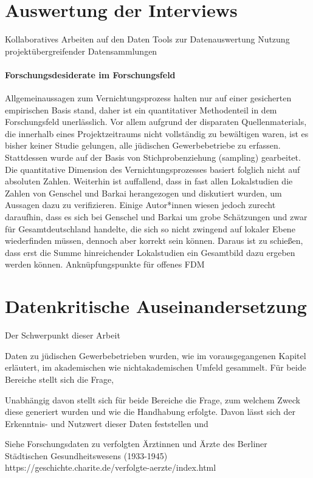 \section{Auswertung der Interviews}
{Kollaboratives Arbeiten auf den Daten
Tools zur Datenauswertung
Nutzung projektübergreifender Datensammlungen
\paragraph{Forschungsdesiderate im Forschungsfeld}Allgemeinaussagen zum Vernichtungsprozess halten nur auf einer gesicherten empirischen Basis stand, daher ist ein quantitativer Methodenteil in dem Forschungsfeld unerlässlich. Vor allem aufgrund der disparaten Quellenmaterials, die innerhalb eines Projektzeitraums nicht vollständig zu bewältigen waren, ist es bisher keiner Studie gelungen, alle jüdischen Gewerbebetriebe zu erfassen. Stattdessen wurde auf der Basis von Stichprobenziehung (sampling) gearbeitet. Die quantitative Dimension des Vernichtungsprozesses basiert folglich nicht auf absoluten Zahlen.
Weiterhin ist auffallend, dass in fast allen Lokalstudien die Zahlen von Genschel und Barkai herangezogen und diskutiert wurden, um Aussagen dazu zu verifizieren. Einige Autor*innen wiesen jedoch zurecht daraufhin, dass es sich bei Genschel und Barkai um grobe Schätzungen und zwar für Gesamtdeutschland handelte, die sich so nicht zwingend auf lokaler Ebene wiederfinden müssen, dennoch aber korrekt sein können. Daraus ist zu schießen, dass erst die Summe hinreichender Lokalstudien ein Gesamtbild dazu ergeben werden können.
Anknüpfungspunkte für offenes FDM

\section{Datenkritische Auseinandersetzung}

Der Schwerpunkt dieser Arbeit


Daten zu jüdischen Gewerbebetrieben wurden, wie im vorausgegangenen Kapitel erläutert, im akademischen wie nichtakademischen Umfeld gesammelt. Für beide Bereiche stellt sich die Frage, 

Unabhängig davon stellt sich für beide Bereiche die Frage, zum welchem Zweck diese generiert wurden und wie die Handhabung erfolgte. Davon lässt sich der Erkenntnis- und Nutzwert dieser Daten feststellen und 


Siehe Forschungsdaten zu verfolgten Ärztinnen und Ärzte des Berliner Städtischen Gesundheitswesens (1933-1945)
https://geschichte.charite.de/verfolgte-aerzte/index.html


}
